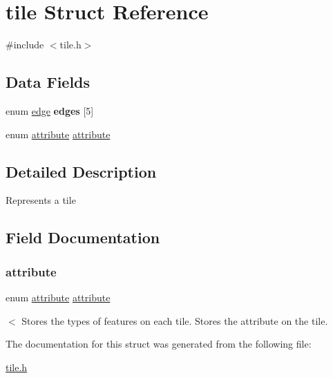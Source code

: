 \hypertarget{structtile}{}\section{tile Struct Reference}
\label{structtile}


{\ttfamily \#include $<$tile.\+h$>$}

\subsection*{Data Fields}
\begin{DoxyCompactItemize}
\item 
\hypertarget{structtile_acb31febe15a01d3ea1068f7bc61b27d1}{}\label{structtile_acb31febe15a01d3ea1068f7bc61b27d1} 
enum \hyperlink{edge_8h_a4ef43ff5c6d42dacbc8ffd9c8cfdc189}{edge} {\bfseries edges} \mbox{[}5\mbox{]}
\item 
enum \hyperlink{tile_8h_a8f0c280065ea816a46055979fae1d21d}{attribute} \hyperlink{structtile_abc1324ab6e30f0eca383076bfc1d906c}{attribute}
\end{DoxyCompactItemize}


\subsection{Detailed Description}
Represents a tile 

\subsection{Field Documentation}
\hypertarget{structtile_abc1324ab6e30f0eca383076bfc1d906c}{}\label{structtile_abc1324ab6e30f0eca383076bfc1d906c} 
\subsubsection{\texorpdfstring{attribute}{attribute}}
{\footnotesize\ttfamily enum \hyperlink{tile_8h_a8f0c280065ea816a46055979fae1d21d}{attribute} \hyperlink{tile_8h_a8f0c280065ea816a46055979fae1d21d}{attribute}}

$<$ Stores the types of features on each tile. Stores the attribute on the tile. 

The documentation for this struct was generated from the following file\+:\begin{DoxyCompactItemize}
\item 
\hyperlink{tile_8h}{tile.\+h}\end{DoxyCompactItemize}
